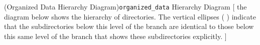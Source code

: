 \Section*(Organized Data Hierarchy Diagram){\texttt{organized\_data} Hierarchy Diagram}%
[%
	\vspace{-2mm}%
	the diagram below shows the hierarchy of  directories.  The vertical ellipses (\,\protect\tinyvdots\,) indicate that the subdirectories below this level of the branch are identical to those below this same level of the branch that shows these subdirectories explicitly.%
]
